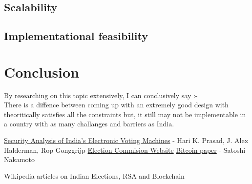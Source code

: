 \documentclass[12pt]{report}
\begin{document}
\section{Scalability}
\section{Implementational feasibility}


\chapter{Conclusion}
By researching on this topic extensively, I can conclusively say :- 
\\
There is a diffence between coming up with an extremely good design with theoritically satisfies all the constraints but, it still may not be implementable in a country with as many challanges and barriers as India.

\begin{thebibliography}{9}
\href{https://indiaevm.org/evm_tr2010-jul29.pdf}{Security Analysis of India’s Electronic Voting Machines} - Hari K. Prasad, J. Alex Halderman, Rop Gonggrijp%
\href{http://eci.nic.in/eci_main1/current/StatusPaper-EVM.pdf}{Election Commision Website}
\href{https://bitcoin.org/bitcoin.pdf}{Bitcoin paper} - Satoshi Nakamoto

Wikipedia articles on Indian Elections, RSA and Blockchain
\end{thebibliography}
\end{document}
